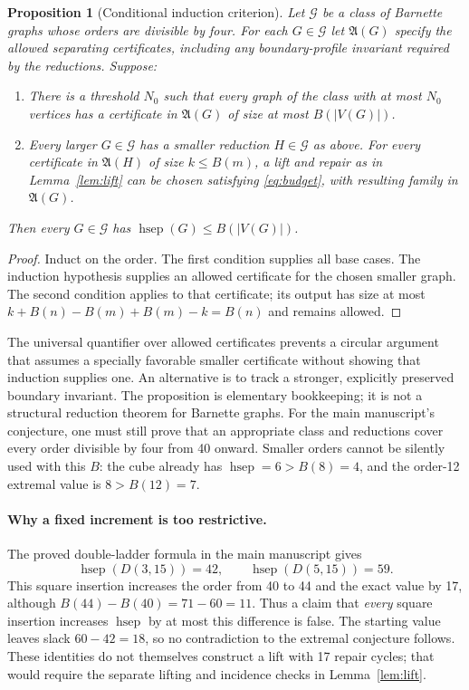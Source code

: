 \documentclass[10pt]{article}
\newtheorem{proposition}[theorem]{Proposition}
\newcommand{\hsep}{\operatorname{hsep}}
\begin{document}
\begin{proposition}[Conditional induction criterion]\label{prop:induction}
Let $\mathcal G$ be a class of Barnette graphs whose orders are divisible
by four. For each $G\in\mathcal G$ let $\mathfrak A(G)$ specify the allowed
separating certificates, including any boundary-profile invariant required
by the reductions. Suppose:
\begin{enumerate}
\item There is a threshold $N_0$ such that every graph of the class with at
most $N_0$ vertices has a certificate in $\mathfrak A(G)$ of size at most
$B(|V(G)|)$.
\item Every larger $G\in\mathcal G$ has a smaller reduction
$H\in\mathcal G$ as above. For every certificate in $\mathfrak A(H)$ of
size $k\le B(m)$, a lift and repair as in Lemma~\ref{lem:lift} can be
chosen satisfying \eqref{eq:budget}, with resulting family in
$\mathfrak A(G)$.
\end{enumerate}
Then every $G\in\mathcal G$ has $\hsep(G)\le B(|V(G)|)$.
\end{proposition}
\begin{proof}
Induct on the order. The first condition supplies all base cases. The
induction hypothesis supplies an allowed certificate for the chosen smaller
graph. The second condition applies to that certificate; its output has
size at most $k+B(n)-B(m)+B(m)-k=B(n)$ and remains allowed.
\end{proof}

The universal quantifier over allowed certificates prevents a circular
argument that assumes a specially favorable smaller certificate without
showing that induction supplies one. An alternative is to track a stronger,
explicitly preserved boundary invariant. The proposition is elementary
bookkeeping; it is not a structural reduction theorem for Barnette graphs.
For the main manuscript's conjecture, one must still prove that an appropriate
class and reductions cover every order divisible by four from 40 onward.
Smaller orders cannot be silently used with this $B$: the cube already has
$\hsep=6>B(8)=4$, and the order-12 extremal value is $8>B(12)=7$.

\paragraph{Why a fixed increment is too restrictive.}
The proved double-ladder formula in the main manuscript gives
\[
 \hsep(D(3,15))=42,\qquad \hsep(D(5,15))=59.
\]
This square insertion increases the order from 40 to 44 and the exact value
by 17, although $B(44)-B(40)=71-60=11$. Thus a claim that \emph{every}
square insertion increases $\hsep$ by at most this difference is false.
The starting value leaves slack $60-42=18$, so no contradiction to the
extremal conjecture follows. These identities do not themselves construct
a lift with 17 repair cycles; that would require the separate lifting
and incidence checks in Lemma~\ref{lem:lift}.
\end{document}
